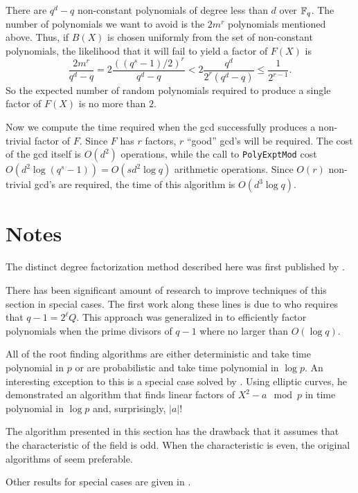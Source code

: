 There are $q^d - q$ non-constant polynomials of degree less than $d$
over $\mathbb{F}_q$.  The number of polynomials we want to avoid is the $2
m^r$ polynomials mentioned above.  Thus, if $B(X)$ is chosen uniformly
from the set of non-constant polynomials, the likelihood that it will
fail to yield a factor of $F(X)$ is
\[
\frac{2m^r}{q^d - q} = 2 \frac{((q^s-1)/2)^r}{q^d -q} 
  < 2 \frac{q^d}{2^r (q^d -q)} \le \frac{1}{2^{r-1}}.
\]
So the expected number of random polynomials required to produce a
single factor of $F(X)$ is no more than $2$.

Now we compute the time required when the {\sc gcd} successfully
produces a non-trivial factor of $F$.  Since $F$ has $r$ factors, $r$
``good'' {\sc gcd}'s will be required.  The cost of the {\sc gcd}
itself is $O(d^2)$ operations, while the call to {\tt PolyExptMod}
cost $O(d^2 \log (q^s - 1)) = O(s d^2 \log q)$ arithmetic operations.
Since $O(r)$ non-trivial {\sc gcd}'s are required, the time of
this algorithm is $O(d^3 \log q)$.

\section*{Notes}

\small

 The distinct degree factorization
method described here was first published by {\Arwin} \cite{Arwin18}.

  There has been significant amount of
research to improve techniques of this section in special cases.  The
first work along these lines is due to {\Moenck} \cite{Moenck77} who 
requires that $q-1 = 2^{\ell} Q$.  This approach was generalized in
\cite{Menezes88,Oorschot89,Menezes92} to efficiently factor
polynomials when the prime divisors of $q-1$ where no larger than
$O(\log q)$. 

All of the root finding algorithms are either deterministic and take
time polynomial in $p$ or are probabilistic and take time polynomial
in $\log p$.  An interesting exception to this is a special case
solved by {\Schoof} \cite{Schoof85}.  Using elliptic 
curves, he demonstrated an algorithm that finds 
linear factors of $X^2 - a \mod{p}$ in time polynomial in $\log p$ and, 
surprisingly, $|a|$!   

 The algorithm presented in this
section has the drawback that it assumes that the characteristic of
the field is odd.  When the characteristic is even, the original
algorithms of {\Berlekamp} \cite{Berlekamp67,Berlekamp70} seem
preferable.

Other results for special cases are given in
\cite{Huang91a,Huang91b,Ronyai89,Niederreiter93a,Niederreiter93b}. 


\normalsize
